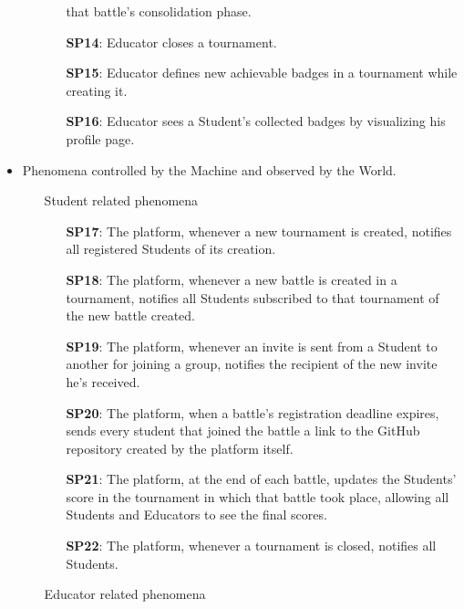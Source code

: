 \documentclass{article}
\begin{document}
\begin{itemize}
\begin{enumerate}
\begin{enumerate}
                         that battle's consolidation phase.
                        \item[\textbf{SP14}:] Educator closes a tournament.
                        \item[\textbf{SP15}:] Educator defines new achievable badges in a tournament while creating it.
                        \item[\textbf{SP16}:] Educator sees a Student's collected badges by visualizing his profile page.
                    \end{enumerate}
          \end{enumerate}

    \item Phenomena controlled by the Machine and observed by the World.
          \begin{enumerate}
              \item[\ding{228}] Student related phenomena
                    \begin{enumerate}
                        \item[\textbf{SP17}:] The platform, whenever a new tournament is created, notifies all registered Students of its creation.
                        \item[\textbf{SP18}:] The platform, whenever a new battle is created in a tournament, notifies all Students subscribed to that 
                        tournament of the new battle created.
                        \item[\textbf{SP19}:] The platform, whenever an invite is sent from a Student to another for joining a group, notifies the recipient 
                        of the new invite he's received.
                        \item[\textbf{SP20}:] The platform, when a battle's registration deadline expires, sends every student that
                         joined the battle a link to the GitHub repository created by the platform itself.
                        \item[\textbf{SP21}:] The platform, at the end of each battle, updates the Students' score in the tournament in
                         which that battle took place, allowing all Students and Educators to see the final scores.
                        \item[\textbf{SP22}:] The platform, whenever a tournament is closed, notifies all Students.
                    \end{enumerate}
              \item[\ding{228}] Educator related phenomena

\end{enumerate}
\end{itemize}
\end{document}
